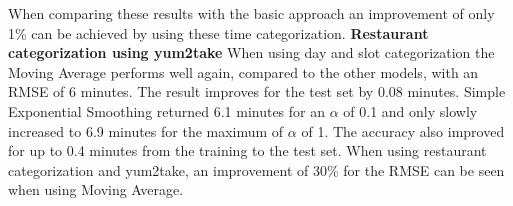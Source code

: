 When comparing these results with the basic approach an improvement of only 1\% can be achieved by using these time categorization.
\newline\newline\textbf{Restaurant categorization using yum2take}\newline
When using day and slot categorization the Moving Average performs well again, compared to the other models, with an RMSE of 6 minutes. The result improves for the test set by 0.08 minutes. Simple Exponential Smoothing returned 6.1 minutes for an $\alpha$ of 0.1 and only slowly increased to 6.9 minutes for the maximum of $\alpha$ of 1. The accuracy also improved for up to 0.4 minutes from the training to the test set.\newline
When using restaurant categorization and yum2take, an improvement of 30\% for the RMSE can be seen when using Moving Average.
